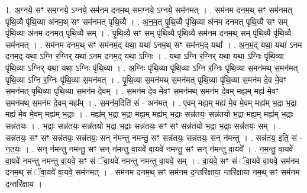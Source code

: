 \documentclass[17pt]{extarticle}
\begin{document}
1. अ॒ग्नये॒ सꣳ सम॒ग्नये॒ ऽग्नये॒ सम॑नम दनम॒थ् सम॒ग्नये॒ ऽग्नये॒ सम॑नमत् । . सम॑नम दनम॒थ् सꣳ सम॑नमत् पृथि॒व्यै पृ॑थि॒व्या अ॑नम॒थ् सꣳ सम॑नमत् पृथि॒व्यै । . अ॒न॒म॒त् पृ॒थि॒व्यै पृ॑थि॒व्या अ॑नम दनमत् पृथि॒व्यै सꣳ सम् पृ॑थि॒व्या अ॑नम दनमत् पृथि॒व्यै सम् । . पृ॒थि॒व्यै सꣳ सम् पृ॑थि॒व्यै पृ॑थि॒व्यै सम॑नम दनम॒थ् सम् पृ॑थि॒व्यै पृ॑थि॒व्यै सम॑नमत् । . सम॑नम दनम॒थ् सꣳ सम॑नम॒द् यथा॒ यथा॑ ऽनम॒थ् सꣳ सम॑नम॒द् यथा᳚ । . अ॒न॒म॒द् यथा॒ यथा॑ ऽनम दनम॒द् यथा॒ ऽग्नि र॒ग्निर् यथा॑ ऽनम दनम॒द् यथा॒ ऽग्निः । . यथा॒ ऽग्नि र॒ग्निर् यथा॒ यथा॒ ऽग्निः पृ॑थि॒व्या पृ॑थि॒व्या ऽग्निर् यथा॒ यथा॒ ऽग्निः पृ॑थि॒व्या । . अ॒ग्निः पृ॑थि॒व्या पृ॑थि॒व्या ऽग्नि र॒ग्निः पृ॑थि॒व्या स॒मन॑मथ् स॒मन॑मत् पृथि॒व्या ऽग्नि र॒ग्निः पृ॑थि॒व्या स॒मन॑मत् । . पृ॒थि॒व्या स॒मन॑मथ् स॒मन॑मत् पृथि॒व्या पृ॑थि॒व्या स॒मन॑म दे॒व मे॒वꣳ स॒मन॑मत् पृथि॒व्या पृ॑थि॒व्या स॒मन॑म दे॒वम् । . स॒मन॑म दे॒व मे॒वꣳ स॒मन॑मथ् स॒मन॑म दे॒वम् मह्य॒म् मह्य॑ मे॒वꣳ स॒मन॑मथ् स॒मन॑म दे॒वम् मह्य᳚म् । . स॒मन॑म॒दिति॑ सं - अन॑मत् । . ए॒वम् मह्य॒म् मह्य॑ मे॒व मे॒वम् मह्य॑म् भ॒द्रा भ॒द्रा मह्य॑ मे॒व मे॒वम् मह्य॑म् भ॒द्राः । . मह्य॑म् भ॒द्रा भ॒द्रा मह्य॒म् मह्य॑म् भ॒द्राः सन्न॑तयः॒ सन्न॑तयो भ॒द्रा मह्य॒म् मह्य॑म् भ॒द्राः सन्न॑तयः । . भ॒द्राः सन्न॑तयः॒ सन्न॑तयो भ॒द्रा भ॒द्राः सन्न॑तयः॒ सꣳ सꣳ सन्न॑तयो भ॒द्रा भ॒द्राः सन्न॑तयः॒ सम् । . सन्न॑तयः॒ सꣳ सꣳ सन्न॑तयः॒ सन्न॑तयः॒ सन् न॑मन्तु नमन्तु॒ सꣳ सन्न॑तयः॒ सन्न॑तयः॒ सन् न॑मन्तु । . सन्न॑तय॒ इति॒ सं - न॒त॒यः॒ । . सन् न॑मन्तु नमन्तु॒ सꣳ सन् न॑मन्तु वा॒यवे॑ वा॒यवे॑ नमन्तु॒ सꣳ सन् न॑मन्तु वा॒यवे᳚ । . न॒म॒न्तु॒ वा॒यवे॑ वा॒यवे॑ नमन्तु नमन्तु वा॒यवे॒ सꣳ सं ॅवा॒यवे॑ नमन्तु नमन्तु वा॒यवे॒ सम् । . वा॒यवे॒ सꣳ सं ॅवा॒यवे॑ वा॒यवे॒ सम॑नम दनम॒थ् सं ॅवा॒यवे॑ वा॒यवे॒ सम॑नमत् । . सम॑नम दनम॒थ् सꣳ सम॑नम द॒न्तरि॑क्षाया॒ न्तरि॑क्षाया नम॒थ् सꣳ सम॑नम द॒न्तरि॑क्षाय । \newline
\end{document}
